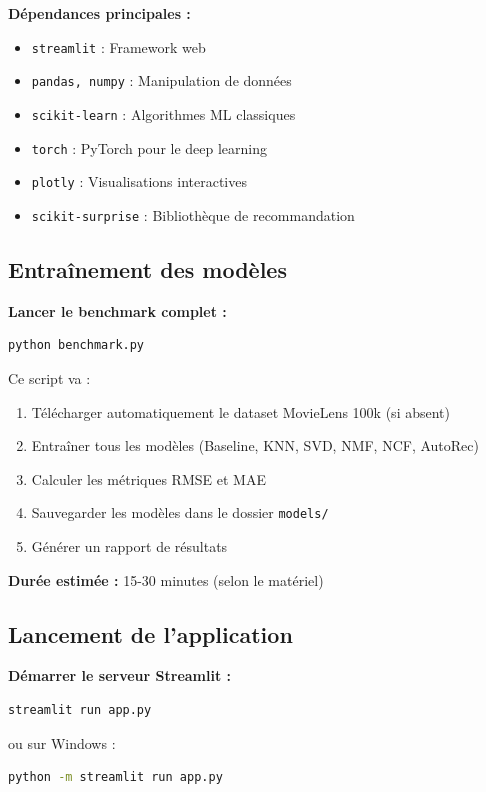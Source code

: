 \documentclass[12pt,a4paper]{article}
\begin{document}
\textbf{Dépendances principales :}
\begin{itemize}
    \item \texttt{streamlit} : Framework web
    \item \texttt{pandas, numpy} : Manipulation de données
    \item \texttt{scikit-learn} : Algorithmes ML classiques
    \item \texttt{torch} : PyTorch pour le deep learning
    \item \texttt{plotly} : Visualisations interactives
    \item \texttt{scikit-surprise} : Bibliothèque de recommandation
\end{itemize}

\subsection{Entraînement des modèles}

\textbf{Lancer le benchmark complet :}
\begin{lstlisting}[language=bash, caption=Entraînement de tous les modèles]
python benchmark.py
\end{lstlisting}

Ce script va :
\begin{enumerate}
    \item Télécharger automatiquement le dataset MovieLens 100k (si absent)
    \item Entraîner tous les modèles (Baseline, KNN, SVD, NMF, NCF, AutoRec)
    \item Calculer les métriques RMSE et MAE
    \item Sauvegarder les modèles dans le dossier \texttt{models/}
    \item Générer un rapport de résultats
\end{enumerate}

\textbf{Durée estimée :} 15-30 minutes (selon le matériel)

\subsection{Lancement de l'application}

\textbf{Démarrer le serveur Streamlit :}
\begin{lstlisting}[language=bash, caption=Lancement de l'application web]
streamlit run app.py
\end{lstlisting}

ou sur Windows :
\begin{lstlisting}[language=bash]
python -m streamlit run app.py
\end{lstlisting}
\end{document}
